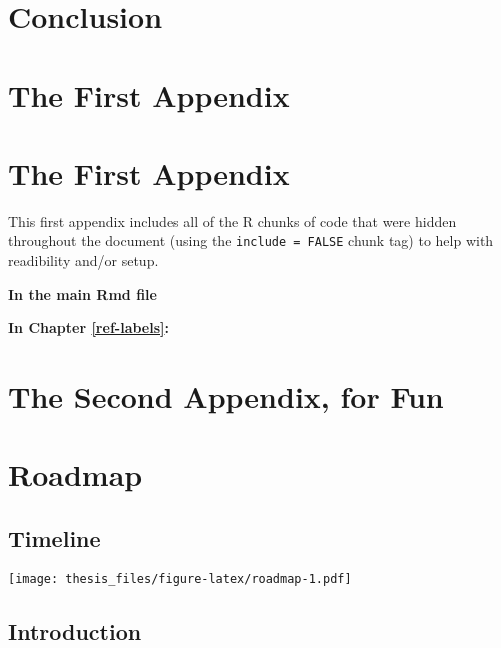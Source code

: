 \documentclass[12pt,twoside]{reedthesis}
\begin{document}
\hypertarget{conclusion}{%
\chapter*{Conclusion}\label{conclusion}}

\appendix

\appendix

\hypertarget{the-first-appendix}{%
\chapter{The First Appendix}\label{the-first-appendix}}

\appendix

\hypertarget{the-first-appendix-1}{%
\chapter{The First Appendix}\label{the-first-appendix-1}}

This first appendix includes all of the R chunks of code that were hidden throughout the document (using the \texttt{include\ =\ FALSE} chunk tag) to help with readibility and/or setup.

\textbf{In the main Rmd file}

\textbf{In Chapter \ref{ref-labels}:}

\hypertarget{the-second-appendix-for-fun}{%
\chapter{The Second Appendix, for Fun}\label{the-second-appendix-for-fun}}

\hypertarget{roadmap}{%
\chapter*{Roadmap}\label{roadmap}}

\hypertarget{timeline}{%
\section{Timeline}\label{timeline}}

\texttt{[image: thesis\_files/figure-latex/roadmap-1.pdf]}

\hypertarget{introduction}{%
\section*{Introduction}\label{introduction}}
\end{document}
